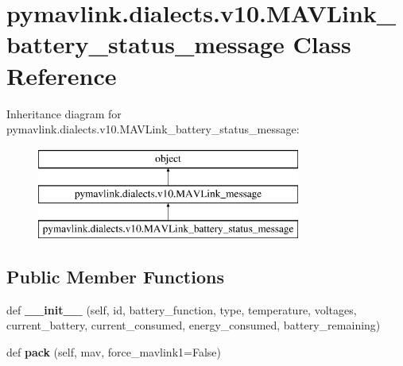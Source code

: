 \hypertarget{classpymavlink_1_1dialects_1_1v10_1_1MAVLink__battery__status__message}{}\section{pymavlink.\+dialects.\+v10.\+M\+A\+V\+Link\+\_\+battery\+\_\+status\+\_\+message Class Reference}
\label{classpymavlink_1_1dialects_1_1v10_1_1MAVLink__battery__status__message}
Inheritance diagram for pymavlink.\+dialects.\+v10.\+M\+A\+V\+Link\+\_\+battery\+\_\+status\+\_\+message\+:\begin{figure}[H]
\begin{center}
\leavevmode
\includegraphics[height=3.000000cm]{classpymavlink_1_1dialects_1_1v10_1_1MAVLink__battery__status__message}
\end{center}
\end{figure}
\subsection*{Public Member Functions}
\begin{DoxyCompactItemize}
\item 
\mbox{\label{classpymavlink_1_1dialects_1_1v10_1_1MAVLink__battery__status__message_a7dad8f414a1c3fbc52ac07ef7d8c5a52}} 
def {\bfseries \+\_\+\+\_\+init\+\_\+\+\_\+} (self, id, battery\+\_\+function, type, temperature, voltages, current\+\_\+battery, current\+\_\+consumed, energy\+\_\+consumed, battery\+\_\+remaining)
\item 
\mbox{\label{classpymavlink_1_1dialects_1_1v10_1_1MAVLink__battery__status__message_abfb88ec059f067a35983c3dd707af74e}} 
def {\bfseries pack} (self, mav, force\+\_\+mavlink1=False)
\end{DoxyCompactItemize}
